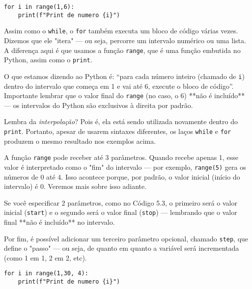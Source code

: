 \documentclass[12pt]{book}
\begin{document}
	\begin{lstlisting}[caption={Printando com o laço for}]
for i in range(1,6):
	print(f"Print de numero {i}")\end{lstlisting}
	
	Assim como o \texttt{while}, o \texttt{for} também executa um bloco de código várias vezes. Dizemos que ele "itera" — ou seja, percorre um intervalo numérico ou uma lista. A diferença aqui é que usamos a função \texttt{range}, que é uma função embutida no Python, assim como o \texttt{print}.
	
	O que estamos dizendo ao Python é: “para cada número inteiro (chamado de \texttt{i}) dentro do intervalo que começa em 1 e vai até 6, execute o bloco de código”. Importante lembrar que o valor final do \texttt{range} (no caso, o 6) **não é incluído** — os intervalos do Python são exclusivos à direita por padrão.
	
	Lembra da \textit{interpolação}? Pois é, ela está sendo utilizada novamente dentro do \texttt{print}.  
	Portanto, apesar de usarem sintaxes diferentes, os laços \texttt{while} e \texttt{for} produzem o mesmo resultado nos exemplos acima.
	
	\begin{tcolorbox}[colback=gray!10, colframe=black, title={\large\bfseries Observação}]
		A função \texttt{range} pode receber até 3 parâmetros. Quando recebe apenas 1, esse valor é interpretado como o "fim" do intervalo — por exemplo, \texttt{range(5)} gera os números de 0 até 4. Isso acontece porque, por padrão, o valor inicial (início do intervalo) é 0. Veremos mais sobre isso adiante.\newline
		
		Se você especificar 2 parâmetros, como no Código 5.3, o primeiro será o valor inicial (\texttt{start}) e o segundo será o valor final (\texttt{stop}) — lembrando que o valor final **não é incluído** no intervalo.\newline
		
		Por fim, é possível adicionar um terceiro parâmetro opcional, chamado \texttt{step}, que define o "passo" — ou seja, de quanto em quanto a variável será incrementada (como 1 em 1, 2 em 2, etc).
	\end{tcolorbox}
	
	\vspace{2em}
	\begin{lstlisting}[caption={Outro exemplo de print com for}]
for i in range(1,30, 4):
	print(f"Print de numero {i}")\end{lstlisting}
	
\end{document}
